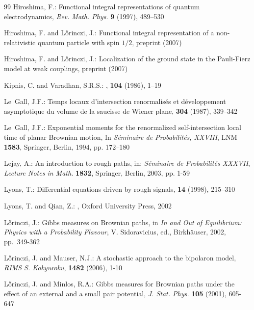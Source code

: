\documentclass[a4paper,11pt]{article}
\begin{document}
\begin{thebibliography}{99}
Hiroshima, F.: Functional integral representations of quantum 
electrodynamics, {\it Rev. Math. Phys.} {\bf 9}  (1997), 489--530

Hiroshima, F. and L\H{o}rinczi, J.: Functional integral representation
of a non-relativistic quantum particle with spin $1/2$, preprint
(2007)

Hiroshima, F. and L\H{o}rinczi, J.: Localization of the ground state
in the Pauli-Fierz model at weak couplings, preprint (2007)

Kipnis, C. and Varadhan, S.R.S.:
,
 {\bf 104} (1986), 1--19

Le~Gall, J.F.:
\newblock Temps locaux d'intersection renormalis\'es et d\'eveloppement
  asymptotique du volume de la saucisse de {W}iener plane,
 {\bf 304} (1987),
339--342

Le~Gall, J.F.:
\newblock Exponential moments for the renormalized self-intersection local time
  of planar {B}rownian motion,
\newblock In {\em S\'eminaire de Probabilit\'es, XXVIII}, LNM {\bf 1583}, 
Springer, Berlin, 1994, pp. 172--180

 
Lejay, A.:
\newblock An introduction to rough paths,
\newblock in: {\em S\'eminaire de Probabilit\'es XXXVII}, {\em
  Lecture Notes in Math.} {\bf 1832}, Springer, Berlin, 2003, pp. 1-59

Lyons, T.:
\newblock Differential equations driven by rough signals,
 {\bf 14} (1998), 215--310

Lyons, T. and Qian, Z.:
,
\newblock Oxford University Press, 2002

L\H{o}rinczi, J.: Gibbs measures on Brownian paths, in {\it In and Out 
of Equilibrium: Physics with a Probability Flavour}, V. Sidoravicius, 
ed., Birkh\"auser, 2002, pp.\ 349-362

L\H{o}rinczi, J. and Mauser, N.J.: A stochastic approach to the
bipolaron model, {\it RIMS S. Kokyuroku}, {\bf 1482} (2006), 1-10

L\H{o}rinczi, J. and Minlos, R.A.: Gibbs measures for Brownian paths 
under the effect of an external and a small pair potential, {\it
  J. Stat. Phys.} {\bf 105} (2001), 605-647 


\end{thebibliography}
\end{document}
